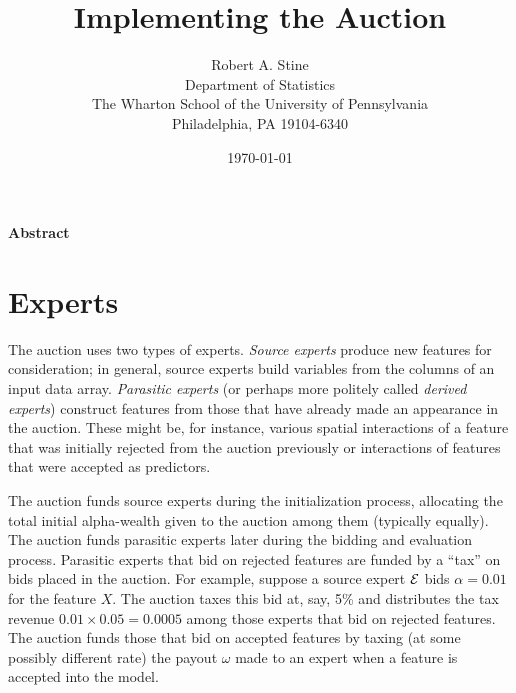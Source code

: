 \documentclass[12pt]{article}
\title{  
         Implementing the Auction
}
\author{
        Robert A. Stine                                      \\
        Department of Statistics                             \\
        The Wharton School of the University of Pennsylvania \\
        Philadelphia, PA 19104-6340                          \\
}
\date{\today}
\begin{document}
\maketitle 

\vspace{-0.5in} \centerline{\bf Abstract} 

\clearpage

\section{Experts} %

 The auction uses two types of experts.  {\em Source experts} produce new
 features for consideration; in general, source experts build variables from the
 columns of an input data array.  {\em Parasitic experts} (or perhaps more
 politely called {\em derived experts}) construct features from those that have
 already made an appearance in the auction.  These might be, for instance,
 various spatial interactions of a feature that was initially rejected from the
 auction previously or interactions of features that were accepted as
 predictors.


 The auction funds source experts during the initialization process, allocating
 the total initial alpha-wealth given to the auction among them (typically
 equally).  The auction funds parasitic experts later during the bidding and
 evaluation process.  Parasitic experts that bid on rejected features are funded
 by a ``tax'' on bids placed in the auction.  For example, suppose a source
 expert $\cal E$ bids $\alpha = 0.01$ for the feature $X$. The auction taxes
 this bid at, say, 5\% and distributes the tax revenue $0.01 \times 0.05 =
 0.0005$ among those experts that bid on rejected features.  The auction funds
 those that bid on accepted features by taxing (at some possibly different rate)
 the payout $\omega$ made to an expert when a feature is accepted into the
 model.
\end{document}
